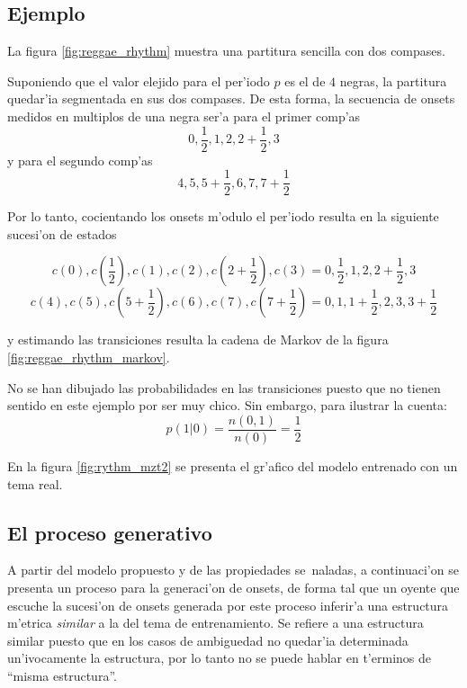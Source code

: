 \subsection{Ejemplo}
La figura \ref{fig:reggae_rhythm}  muestra una partitura sencilla con dos compases.
\begin{imagen}
\end{imagen}

Suponiendo que el valor elejido para el per'iodo $p$ es el de $4$ negras, la partitura quedar'ia segmentada en sus dos compases. 
De esta forma, la secuencia de onsets medidos en multiplos de una negra ser'a para el primer comp'as
$$0, \frac{1}{2}, 1, 2, 2+\frac{1}{2}, 3$$
y para el segundo comp'as 
$$4, 5, 5+\frac{1}{2}, 6, 7, 7+\frac{1}{2}$$

Por lo tanto, cocientando los onsets m'odulo el per'iodo resulta en la siguiente sucesi'on de estados

$$c(0), c(\frac{1}{2}), c(1), c(2), c(2+\frac{1}{2}), c(3) = 0, \frac{1}{2}, 1, 2, 2+\frac{1}{2}, 3$$
$$c(4), c(5), c(5+\frac{1}{2}), c(6), c(7), c(7+\frac{1}{2}) = 0, 1, 1+\frac{1}{2}, 2, 3, 3+\frac{1}{2}$$

y estimando las transiciones resulta la cadena de Markov de la figura \ref{fig:reggae_rhythm_markov}.
\begin{imagen}
\end{imagen}

No se han dibujado las probabilidades en las transiciones puesto que no tienen sentido en este ejemplo por ser muy chico. Sin embargo, para ilustrar la cuenta:
$$p(1|0) = \frac{n(0, 1)}{n(0)} = \frac{1}{2}$$

En la figura \ref{fig:rythm_mzt2} se presenta el gr'afico del modelo entrenado con un tema real.
\begin{imagen}
    \width{5cm}
\end{imagen}

\subsection{El proceso generativo}
A partir del modelo propuesto y de las propiedades se~naladas, a continuaci'on se presenta un proceso para la generaci'on de onsets, de forma tal 
que un oyente que escuche la sucesi'on de onsets generada por este proceso inferir'a una estructura m'etrica \emph{similar} a la del tema de 
entrenamiento. Se refiere a una estructura similar puesto que en los casos de ambiguedad no quedar'ia determinada un'ivocamente la estructura, por lo tanto
no se puede hablar en t'erminos de ``misma estructura''.

